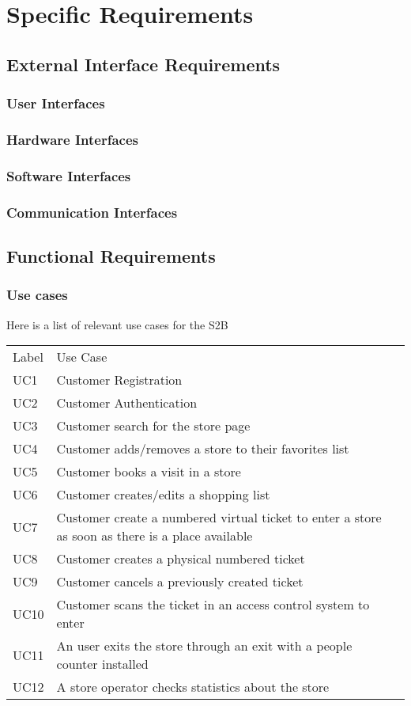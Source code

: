 \section{Specific Requirements}

\subsection{External Interface Requirements}
\subsubsection{User Interfaces}
\subsubsection{Hardware Interfaces}
\subsubsection{Software Interfaces}
\subsubsection{Communication Interfaces}
\subsection{Functional Requirements}
\subsubsection{Use cases}
    Here is a list of relevant use cases for the S2B
    \smallskip
    
    \renewcommand{\arraystretch}{1.4}
    \begin{tabular}{C{2cm}L{10.5cm}C{2.6cm}}
        Label & Use Case       \\
        UC1 & Customer Registration \\
        UC2 & Customer Authentication \\
        UC3 & Customer search for the store page\\
        UC4 & Customer adds/removes a store to their favorites list\\
        UC5 & Customer books a visit in a store \\
        UC6 & Customer creates/edits a shopping list \\
        UC7 & Customer create a numbered virtual ticket to enter a store as soon as there is a place available \\
        UC8 & Customer creates a physical numbered ticket \\
        UC9 & Customer cancels a previously created ticket \\
        UC10 & Customer scans the ticket in an access control system to enter \\
        UC11 & An user exits the store through an exit with a people counter installed \\
        UC12 & A store operator checks statistics about the store\\

    \end{tabular}
    

